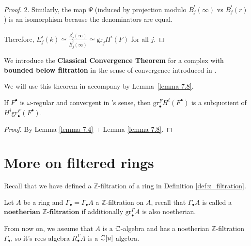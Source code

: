 \begin{proof}
    2. Similarly, the map $\Psi$ (induced by projection modulo $\overline{B}_j^i(\infty)$ vs $\overline{B}_j^i(r)$) is an isomorphism because the denominators are equal.

    Therefore, $E_j^i(k)\simeq\frac{\overline{Z}^{i}_{j}(\infty)}{\overline{B}^{i}_{j}(\infty)} \simeq \mathrm{gr}_j H^i(F) $ for all $j$.
\end{proof}

\begin{remark}\label{rmk:classical_convergence_theorem}
    We introduce the \textbf{Classical Convergence Theorem} \cite[Classical~Convergence~Theorem~5.5.1]{Weibel1994HA} for a complex with \textbf{bounded below filtration} in the sense of convergence introduced in \cite[Convergence~5.2.11]{Weibel1994HA}.

    We will use this theorem in accompany by Lemma~\ref{lemma 7.8}.
\end{remark}

\begin{theorem}\label{tehorem 7.9}
    If $F^\bullet$ is $\omega$-regular and convergent in \cite[Convergence~5.2.11]{Weibel1994HA}'s sense, then $\mathrm{gr}^F_{\bullet} H^{i}(F^{\bullet})$ is a subquotient of $H^{i} \mathrm{gr}^{F}_{\bullet }(F^{\bullet})$.
\end{theorem}
\begin{proof}
    By Lemma \ref{lemma 7.4} + Lemma \ref{lemma 7.8}.
\end{proof}

\section{More on filtered rings }\label{sect:more_on_filtered_rings}

Recall that we have defined a $\mathbb{Z}$-filtration of a ring in Definition \ref{def:z_filtration}.

Let $A$ be a ring and $\Gamma_{\bullet} = \Gamma_{\bullet}A$ a $\mathbb{Z}$-filtration on $A$, recall that $\Gamma_{\bullet}A$ is called a $\textbf{noetherian } \mathbb{Z}\textbf{-filtration}$ if additionally $\mathrm{gr}^{\Gamma}_\bullet A$ is also noetherian.

From now on, we assume that $A$ is a $\mathbb{C}$-algebra and has a noetherian $\mathbb{Z}$-filtration $\Gamma_{\bullet}$, so it's rees algebra $R_{\bullet}^{\Gamma}A$ is a $\mathbb{C}[u]$ algebra.

